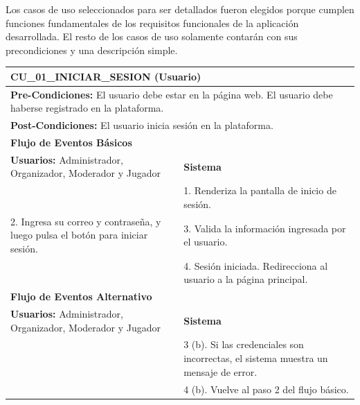 Los casos de uso seleccionados para ser detallados fueron elegidos porque cumplen funciones fundamentales de los requisitos funcionales de la aplicación desarrollada. El resto de los casos de uso solamente contarán con sus precondiciones y una descripción simple.

%
%

\begin{center}
  \begin{tabular}{| p{7.5cm} | p{7.5cm} |}
    \hline
    \multicolumn{2}{|p{15cm}|}{\textbf{CU\_01\_INICIAR\_SESION} (Usuario)} \\ \hline
    \multicolumn{2}{|p{15cm}|}{\textbf{Pre-Condiciones:} El usuario debe estar en la página web. El usuario debe haberse registrado en la plataforma.} \\ \hline
    \multicolumn{2}{|p{15cm}|}{\textbf{Post-Condiciones:} El usuario inicia sesión en la plataforma.} \\ \hline
    \multicolumn{2}{|p{7.5cm}|}{\textbf{Flujo de Eventos Básicos}} \\ \hline
    \multicolumn{1}{|p{7.5cm}|}{\textbf{Usuarios:} Administrador, Organizador, Moderador y Jugador} & \multicolumn{1}{|p{7.5cm}|}{\textbf{Sistema}} \\ \hline
    
    \multicolumn{1}{|p{7.5cm}|}{} & 
    \multicolumn{1}{|p{7.5cm}|}{1. Renderiza la pantalla de inicio de sesión.}\\ \hline
    
    \multicolumn{1}{|p{7.5cm}|}{2. Ingresa su correo y contraseña, y luego pulsa el botón para iniciar sesión.}& 
    \multicolumn{1}{|p{7.5cm}|}{3. Valida la información ingresada por el usuario.}\\ \hline
    
    \multicolumn{1}{|p{7.5cm}|}{} & 
    \multicolumn{1}{|p{7.5cm}|}{4. Sesión iniciada. Redirecciona al usuario a la página principal.}\\ \hline
    
    \multicolumn{2}{|p{7.5cm}|}{\textbf{Flujo de Eventos Alternativo}} \\ \hline
    
    \multicolumn{1}{|p{7.5cm}|}{\textbf{Usuarios:} Administrador, Organizador, Moderador y Jugador} & \multicolumn{1}{|p{7.5cm}|}{\textbf{Sistema}} \\ \hline
    
    \multicolumn{1}{|p{7.5cm}|}{} & 
    \multicolumn{1}{|p{7.5cm}|}{3 (b). Si las credenciales son incorrectas, el sistema muestra un mensaje de error.}\\ \hline
    
    \multicolumn{1}{|p{7.5cm}|}{} & 
    \multicolumn{1}{|p{7.5cm}|}{4 (b). Vuelve al paso 2 del flujo básico.}\\ \hline
  \end{tabular}
\end{center}

